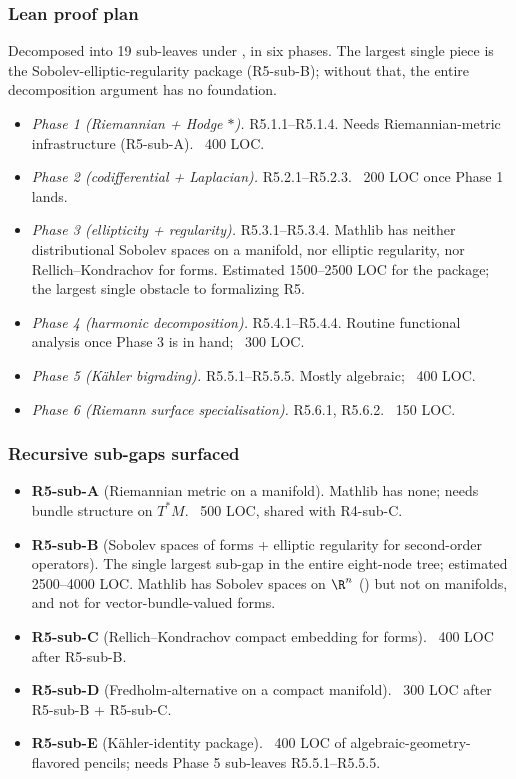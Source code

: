 \subsubsection*{Lean proof plan}

Decomposed into 19 sub-leaves under
, in six phases.
The largest single piece is the Sobolev-elliptic-regularity package
(R5-sub-B); without that, the entire decomposition argument has no
foundation.

\begin{itemize}
\item \emph{Phase 1 (Riemannian + Hodge \(*\)).}  R5.1.1--R5.1.4.
  Needs Riemannian-metric infrastructure (R5-sub-A).  ~400 LOC.
\item \emph{Phase 2 (codifferential + Laplacian).}  R5.2.1--R5.2.3.
  ~200 LOC once Phase 1 lands.
\item \emph{Phase 3 (ellipticity + regularity).}  R5.3.1--R5.3.4.
  Mathlib has neither distributional Sobolev spaces on a manifold,
  nor elliptic regularity, nor Rellich--Kondrachov for forms.
  Estimated 1500--2500 LOC for the package; the largest single
  obstacle to formalizing R5.
\item \emph{Phase 4 (harmonic decomposition).}  R5.4.1--R5.4.4.
  Routine functional analysis once Phase 3 is in hand; ~300 LOC.
\item \emph{Phase 5 (K\"ahler bigrading).}  R5.5.1--R5.5.5.  Mostly
  algebraic; ~400 LOC.
\item \emph{Phase 6 (Riemann surface specialisation).}  R5.6.1,
  R5.6.2.  ~150 LOC.
\end{itemize}

\subsubsection*{Recursive sub-gaps surfaced}

\begin{itemize}
\item \textbf{R5-sub-A} (Riemannian metric on a manifold).
  Mathlib has none; needs bundle structure on \(T^*M\).  ~500 LOC,
  shared with R4-sub-C.
\item \textbf{R5-sub-B} (Sobolev spaces of forms + elliptic regularity
  for second-order operators).  The single largest sub-gap in the
  entire eight-node tree; estimated 2500--4000 LOC.  Mathlib has
  Sobolev spaces on \(\R^n\) ()
  but not on manifolds, and not for vector-bundle-valued forms.
\item \textbf{R5-sub-C} (Rellich--Kondrachov compact embedding for
  forms).  ~400 LOC after R5-sub-B.
\item \textbf{R5-sub-D} (Fredholm-alternative on a compact manifold).
  ~300 LOC after R5-sub-B + R5-sub-C.
\item \textbf{R5-sub-E} (K\"ahler-identity package).  ~400 LOC of
  algebraic-geometry-flavored pencils; needs Phase 5 sub-leaves
  R5.5.1--R5.5.5.
\end{itemize}

